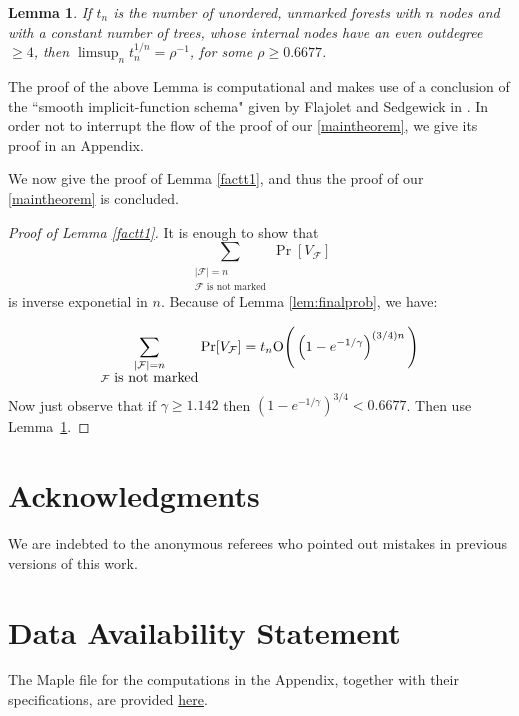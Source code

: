 \documentclass{amsart}
\theoremstyle{plain}
\newtheorem{lemma}{Lemma}
\newcommand{\F}{\mathcal{F}}
\begin{document}





\begin{lemma}\label{lem:boundtrees}
If $t_n$ is the number of  {\rm unordered,  unmarked forests} with $n$ nodes and with a constant number of trees, whose internal nodes have an even outdegree $\geq 4$, then $\limsup_n t_n^{1/n} = \rho ^{-1}$,  for some $\rho \geq 0.6677$.
	\end{lemma}
	
	The proof of the above Lemma is computational and makes use of a conclusion of the ``smooth implicit-function schema" given by Flajolet and Sedgewick in \cite[Theorem VII.3]{Flajolet:2009:AC:1506267}. In order not to interrupt the flow of the proof of our \ref{maintheorem}, we give its proof in an Appendix.
	
	
	We now give the proof of Lemma \ref{factt1}, and thus the proof of  our \ref{maintheorem} is concluded.
	
	\begin{proof}[Proof of Lemma \ref{factt1}] It is enough to show that
	  $$\sum_{\substack{{|\F|=n}\\{\F \mbox{ is not marked}}}}\Pr[V_{\F}]$$	
	  is inverse exponetial in $n$.	Because of Lemma \ref{lem:finalprob}, we have:
	
	$$\sum_{\substack{{|\F|=n}\\{\F \mbox{ is not marked}}}}\Pr[V_{\F}] = t_n {\rm O}\Bigg(  \left(1-e^{-1/\gamma}\right)^{(3/4)n} \Bigg)$$
Now just observe that if $\gamma \geq 1.142$	then $\left(1-e^{-1/\gamma}\right)^{3/4} < 0.6677$. Then use Lemma~\ref{lem:boundtrees}.
	\end{proof}


\section*{Acknowledgments}


We are indebted to the anonymous referees who pointed out mistakes in previous versions of this work. 

\section*{Data Availability Statement}
The Maple file for the computations in the Appendix, together with their specifications, are provided  \href{https://drive.google.com/file/d/1ZRTi95dtOXLDpn2KKEApK2Q1sPOTVK5k/view?usp=sharing}{here}.
\end{document}
